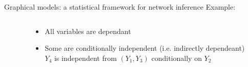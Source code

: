 \documentclass[aspectratio=169]{beamer}
\newcommand{\edgeunit}{1.5}
\newcommand{\emphase}[1]{\textcolor{Complement}{#1}}
\newcommand{\bleu}[1]{\textcolor{Framableulight}{#1}}
\begin{document}
\begin{frame}{Graphical models: a statistical framework for network inference}
\bleu{Example}:\bigskip
\begin{columns}
\begin{column}{0.3\linewidth}\hspace{0.5cm}
\\
\end{column}
\begin{column}{0.5\linewidth}
	\begin{itemize}
	\item All variables are dependant \bigskip
	\item Some are \emphase{conditionally independent} (i.e. indirectly dependeant)\\\bigskip
	 $Y_4$ is independent from $(Y_1, Y_3)$ conditionally on $Y_2$
\end{itemize}
\end{column}
\end{columns}

\end{frame}
\end{document}
